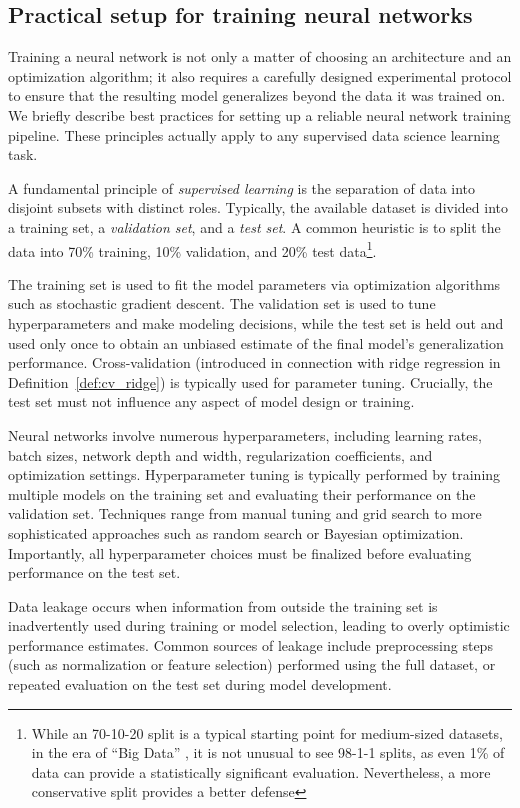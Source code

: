 \subsection{Practical setup for training neural networks}

Training a neural network is not only a matter of choosing an architecture and an optimization algorithm; it also requires a carefully designed experimental protocol to ensure that the resulting model generalizes beyond the data it was trained on. We briefly describe best practices for setting up a reliable neural network training pipeline.
These principles actually apply to any supervised data science learning task.

A fundamental principle of {\em supervised learning} is the separation of data into disjoint subsets with distinct roles. Typically, the available dataset is divided into a {training set}, a {\em validation set}, and a {\em test set}. A common heuristic is to split the data into 70\% training, 10\% validation, and 20\% test data\footnote{While an 70-10-20 split is a typical starting point for medium-sized datasets, in the era of ``Big Data'' , it is not unusual to see 98-1-1 splits, as even 1\% of data can provide a statistically significant evaluation. Nevertheless, a more conservative split provides a better defense}.


The training set is used to fit the model parameters via optimization algorithms such as stochastic gradient descent. The validation set is used to tune hyperparameters and make modeling decisions, while the test set is held out and used only once to obtain an unbiased estimate of the final model’s generalization performance. 
Cross-validation (introduced in connection with ridge regression in  Definition~\ref{def:cv_ridge}) is typically used for parameter tuning.
Crucially, the test set must not influence any aspect of model design or training.

Neural networks involve numerous hyperparameters, including learning rates, batch sizes, network depth and width, regularization coefficients, and optimization settings. 
Hyperparameter tuning is typically performed by training multiple models on the training set and evaluating their performance on the validation set. Techniques range from manual tuning and grid search to more sophisticated approaches such as random search or Bayesian optimization. Importantly, all hyperparameter choices must be finalized before evaluating performance on the test set.

Data leakage occurs when information from outside the training set is inadvertently used during training or model selection, leading to overly optimistic performance estimates. Common sources of leakage include preprocessing steps (such as normalization or feature selection) performed using the full dataset, or repeated evaluation on the test set during model development.

